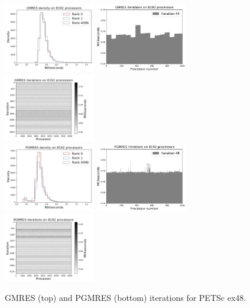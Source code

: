 \documentclass[num-refs]{wiley-article}
\begin{document}
\begin{figure}[t]
\centering
\includegraphics[width=4cm]{../plots/GMRES_ex48_8192_1000000_identical_in_p.png}
\includegraphics[width=4cm]{../plots/GMRES_ex48_8192_1000000_independent_in_p_44.pdf}
\includegraphics[width=4cm]{../plots/GMRES_ex48_8192_1000000_stationary_in_t_colormap.png} \\
\includegraphics[width=4cm]{../plots/PGMRES_ex48_8192_1000000_identical_in_p.png}
\includegraphics[width=4cm]{../plots/PGMRES_ex48_8192_1000000_independent_in_p_48.pdf} 
\includegraphics[width=4cm]{../plots/PGMRES_ex48_8192_1000000_stationary_in_t_colormap.png}
\caption{GMRES (top) and PGMRES (bottom) iterations for PETSc ex48.} \label{fig:ex48}
\end{figure}
\end{document}
